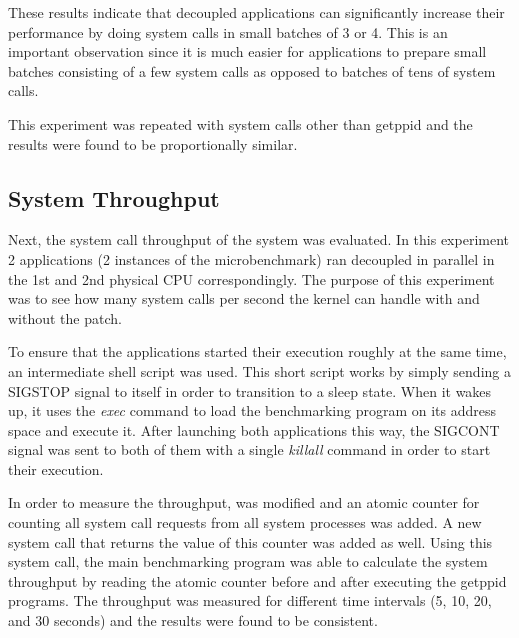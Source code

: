 These results indicate that decoupled applications can significantly increase
their performance by doing system calls in small batches of 3 or 4. This is an
important observation since it is much easier for applications to prepare small
batches consisting of a few system calls as opposed to batches of tens of
system calls.

\begin{table}[h]
\centering
{}
  \caption{Percentage decrease of execution time for different batch sizes over
  standard \llinux in decoupled mode}
\label{tab:batched_decrease}
\end{table}

This experiment was repeated with system calls other than getppid and the
results were found to be proportionally similar.

\subsection{System Throughput}

Next, the system call throughput of the system was evaluated. In this
experiment 2 applications (2 instances of the microbenchmark) ran decoupled in
parallel in the 1st and 2nd physical CPU correspondingly. The purpose of this
experiment was to see how many system calls per second the \llinux kernel can
handle with and without the \memsc patch.

To ensure that the applications started their execution roughly at the same
time, an intermediate shell script was used. This short script works by simply
sending a SIGSTOP signal to itself in order to transition to a sleep state.
When it wakes up, it uses the \emph{exec} command to load the benchmarking
program on its address space and execute it. After launching both applications
this way, the SIGCONT signal was sent to both of them with a single
\emph{killall} command in order to start their execution.

In order to measure the throughput, \llinux was modified and an atomic counter
for counting all system call requests from all system processes was added. A
new system call that returns the value of this counter was added as well. Using
this system call, the main benchmarking program was able to calculate the
system throughput by reading the atomic counter before and after executing the
getppid programs. The throughput was measured for different time intervals (5,
10, 20, and 30 seconds) and the results were found to be consistent.

